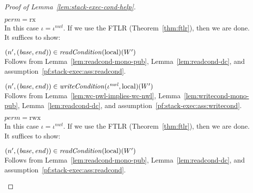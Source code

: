 \documentclass[a4paper]{article}
\newcommand{\var}[1]{\mathit{#1}}
\newcommand{\start}{\var{base}}
\newcommand{\addrend}{\var{end}}
\newcommand{\perm}{\var{perm}}
\newcommand{\nwl}{\var{nwl}}
\newcommand{\plainfun}[2]{
  \ifthenelse{\equal{#2}{}}
  {\mathit{#1}}
  {\mathit{#1}(#2)}
}
\newcommand{\readCond}[1]{\plainfun{readCondition}{#1}}
\newcommand{\writeCond}[1]{\plainfun{writeCondition}{#1}}
\newcommand{\npair}[2][n]{\left(#1,#2 \right)}
\newcommand{\plainperm}[1]{\mathrm{#1}}
\newcommand{\exec}{\plainperm{rx}}
\newcommand{\rwx}{\plainperm{rwx}}
\newcommand{\local}{\plainperm{local}}
\begin{document}
\begin{proof}[Proof of Lemma~\ref{lem:stack-exec-cond-help}]
\begin{enumproof}[resume]
  \item $\perm = \exec$\\
    In this case $\iota= \iota^\nwl$. If we use the FTLR (Theorem~\ref{thm:ftlr}), then we are done. It suffices to show:
    \begin{enumproof}
      \item $\npair[n']{(\start,\addrend)} \in \readCond{}(\local)(W')$ \\
        Follows from Lemma~\ref{lem:readcond-mono-pub}, Lemma~\ref{lem:readcond-dc}, and assumption~\ref{pf:stack-exec:ass:readcond}.
      \item $\npair[n']{(\start,\addrend)} \in \writeCond{}(\iota^\nwl,\local)(W')$\\
        Follows from Lemma~\ref{lem:wc-pwl-implies-wc-nwl}, Lemma~\ref{lem:writecond-mono-pub}, Lemma~\ref{lem:readcond-dc}, and assumption~\ref{pf:stack-exec:ass:writecond}.
    \end{enumproof}
  \item $\perm = \rwx$\\
    In this case $\iota= \iota^\nwl$. If we use the FTLR (Theorem~\ref{thm:ftlr}), then we are done. It suffices to show:
    \begin{enumproof}
      \item $\npair[n']{(\start,\addrend)} \in \readCond{}(\local)(W')$ \\
        Follows from Lemma~\ref{lem:readcond-mono-pub}, Lemma~\ref{lem:readcond-dc}, and assumption~\ref{pf:stack-exec:ass:readcond}.
      \end{enumproof}
\end{enumproof}
\end{proof}
\end{document}
